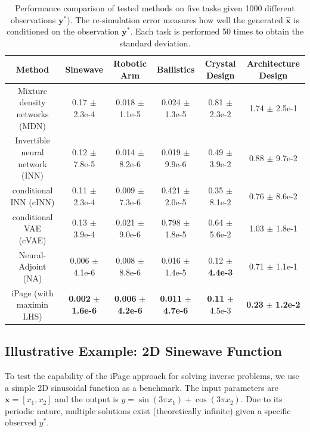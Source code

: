 \documentclass[letterpaper]{article} %
\begin{document}
\begin{table}[!htbp]
\footnotesize
\centering
\caption{Performance comparison of tested methods on five tasks given 1000 different observations $\mathbf{y}^*$). The re-simulation error measures how well the generated $\hat{\mathbf{x}}$ is conditioned on the observation $\mathbf{y}^*$. Each task is performed 50 times to obtain the standard deviation.}
\label{tab:1000_y}
\begin{tabular}{@{}cccccc@{}}
\toprule
Method & Sinewave     & Robotic Arm     & Ballistics     & Crystal Design   & Architecture Design                          \\ \midrule
Mixture density networks (MDN)    & 0.17 $\pm$ 2.3e-4  & 0.018  $\pm$  1.1e-5  & 0.024 $\pm$ 1.3e-5 & 0.81 $\pm$   2.3e-2  & 1.74 $\pm$ 2.5e-1   \\
Invertible neural network (INN)    & 0.12 $\pm$ 7.8e-5  & 0.014  $\pm$  8.2e-6  & 0.019 $\pm$ 9.9e-6 & 0.49 $\pm$ 3.9e-2   & 0.88 $\pm$ 9.7e-2 \\
conditional INN (cINN)   & 0.11 $\pm$ 2.3e-4  & 0.009 $\pm$ 7.3e-6    & 0.421 $\pm$ 2.0e-5   & 0.35 $\pm$ 8.1e-2  & 0.76 $\pm$ 8.6e-2    \\
conditional VAE (cVAE)   & 0.13 $\pm$ 3.9e-4  & 0.021 $\pm$  9.0e-6   & 0.798 $\pm$ 1.8e-5   & 0.64 $\pm$ 5.6e-2  & 1.03 $\pm$ 1.8e-1   \\
Neural-Adjoint (NA)     & 0.006 $\pm$ 4.1e-6 & 0.008  $\pm$  8.8e-6  & 0.016 $\pm$ 1.4e-5   & 0.12 $\pm$  {\bf 4.4e-3}  & 0.71 $\pm$ 1.1e-1 \\ \midrule
iPage (with maximin LHS)  & {\bf 0.002} $\pm$ {\bf 1.6e-6} & {\bf 0.006}  $\pm$  {\bf 4.2e-6}  & {\bf 0.011} $\pm$ {\bf 4.7e-6}   & {\bf 0.11} $\pm$ 4.5e-3  & {\bf 0.23} $\pm$ {\bf 1.2e-2} \\ \bottomrule
\end{tabular}
\end{table}
\subsection{Illustrative Example: 2D Sinewave Function}
To test the capability of the iPage approach for solving inverse problems, we use a simple 2D sinusoidal function as a benchmark. The input parameters are $\mathbf{x} = [x_1, x_2]$ and the output is $y = \sin(3\pi x_1) + \cos(3\pi x_2)$. Due to its periodic nature, multiple solutions exist (theoretically infinite) given a specific observed $y^*$.
\end{document}
